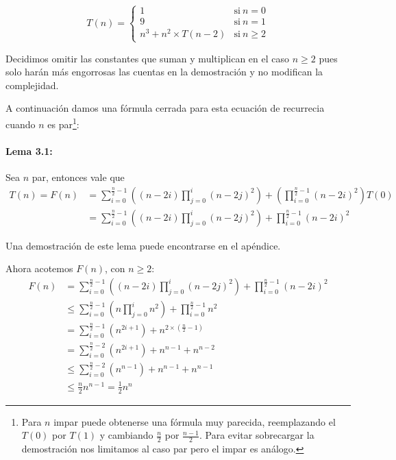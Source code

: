 \begin{equation}
 \label{eq:aqui-le-mostramos-como-hacerle-la-llave-grande}
 T(n) = \left\{
     \begin{array}{ll}
 1      & \mathrm{si\ } n = 0 \\
 9      & \mathrm{si\ } n = 1 \\
 n^3 + n^2\times T(n-2) & \mathrm{si\ } n \geq 2
     \end{array}
   \right.
\end{equation}

Decidimos omitir las constantes que suman y multiplican en el caso $n\geq 2$ pues solo harán más engorrosas las cuentas en la demostración y no modifican la complejidad.

A continuación damos una fórmula cerrada para esta ecuación de recurrecia cuando $n$ es par\footnote{Para $n$ impar puede obtenerse una fórmula muy parecida, reemplazando el $T(0)$ por $T(1)$ y cambiando $\frac{n}{2}$ por $\frac{n-1}{2}$. Para evitar sobrecargar la demostración nos limitamos al caso par pero el impar es análogo.}:

\paragraph{Lema 3.1:} Sea $n$ par, entonces vale que
\begin{equation}
\begin{aligned}
  T(n) =
  F(n) &= \sum_{i=0}^{\frac{n}{2}-1} \left((n-2i) \prod_{j=0}^{i}(n-2j)^2\right) + \left(\prod_{i=0}^{\frac{n}{2}-1}(n-2i)^2\right) T(0)\\
  &= \sum_{i=0}^{\frac{n}{2}-1} \left((n-2i) \prod_{j=0}^{i}(n-2j)^2\right) + \prod_{i=0}^{\frac{n}{2}-1}(n-2i)^2
\end{aligned}
\end{equation}

Una demostración de este lema puede encontrarse en el apéndice.

  Ahora acotemos $F(n)$, con $n \geq 2$:
  \begin{equation}
  \begin{aligned}
  F(n) &= \sum_{i=0}^{\frac{n}{2}-1} \left((n-2i) \prod_{j=0}^{i}(n-2j)^2\right) + \prod_{i=0}^{\frac{n}{2}-1}(n-2i)^2 \\
  &\leq \sum_{i=0}^{\frac{n}{2}-1} \left(n \prod_{j=0}^{i}n^2\right) + \prod_{i=0}^{\frac{n}{2}-1}n^2 \\
  &= \sum_{i=0}^{\frac{n}{2}-1} (n^{2i+1}) + n^{2\times(\frac{n}{2}-1)} \\
  &= \sum_{i=0}^{\frac{n}{2}-2} (n^{2i+1}) + n^{n-1} + n^{n-2} \\
  &\leq \sum_{i=0}^{\frac{n}{2}-2} (n^{n-1}) + n^{n-1} + n^{n-1} \\
  &\leq \frac{n}{2} n^{n-1} 
  = \frac{1}{2} n^{n}
  \end{aligned}
  \end{equation}

